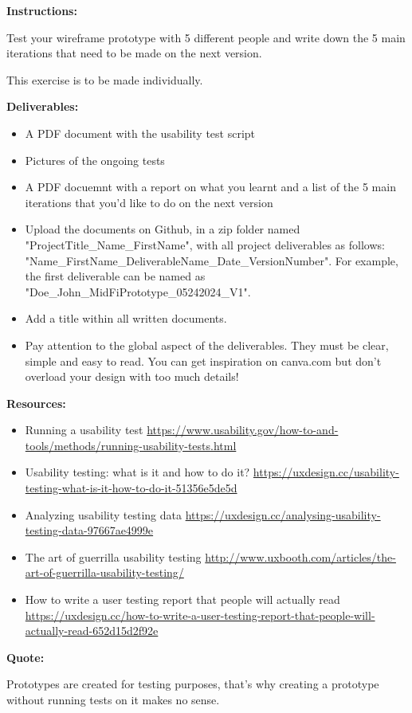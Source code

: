 \makeheaderfiles

\textbf{Instructions:}

Test your wireframe prototype with 5 different people and write down the 5 main iterations that need to be made on the next version.

This exercise is to be made individually.

\textbf{Deliverables:}

\begin{itemize}
\item A PDF document with the usability test script
\item Pictures of the ongoing tests
\item A PDF docuemnt with a report on what you learnt and a list of the 5 main iterations that you'd like to do on the next version
\item Upload the documents on Github, in a zip folder named "ProjectTitle\_Name\_FirstName", with all project deliverables as follows: "Name\_FirstName\_DeliverableName\_Date\_VersionNumber".  For example, the first deliverable can be named as "Doe\_John\_MidFiPrototype\_05242024\_V1".
\item Add a title within all written documents.
\item Pay attention to the global aspect of the deliverables. They must be clear, simple and easy to read. You can get inspiration on canva.com but don't overload your design with too much details!
\end{itemize}

\textbf{Resources:}

\begin{itemize}
\item Running a usability test \url{https://www.usability.gov/how-to-and-tools/methods/running-usability-tests.html}
\item Usability testing: what is it and how to do it? \url{https://uxdesign.cc/usability-testing-what-is-it-how-to-do-it-51356e5de5d}
\item Analyzing usability testing data \url{https://uxdesign.cc/analysing-usability-testing-data-97667ae4999e}
\item The art of guerrilla usability testing \url{http://www.uxbooth.com/articles/the-art-of-guerrilla-usability-testing/}
\item How to write a user testing report that people will actually read \url{https://uxdesign.cc/how-to-write-a-user-testing-report-that-people-will-actually-read-652d15d2f92e}
\end{itemize}

\textbf{Quote:}

Prototypes are created for testing purposes, that's why creating a prototype without running tests on it makes no sense.

